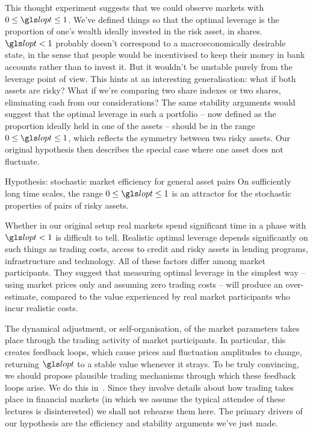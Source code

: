 This thought experiment suggests that we could observe markets with $0\leq\lopt\leq1$. We've defined things so that the optimal leverage is the proportion of one's wealth ideally invested in the risk asset, \ie in shares. $\lopt<1$ probably doesn't correspond to a macroeconomically desirable state, in the sense that people would be incentivised to keep their money in bank accounts rather than to invest it. But it wouldn't be unstable purely from the leverage point of view. This hints at an interesting generalisation: what if both assets are risky? What if we're comparing two share indexes or two shares, eliminating cash from our considerations? The same stability arguments would suggest that the optimal leverage in such a portfolio -- now defined as the proportion ideally held in one of the assets -- should be in the range $0\leq\lopt\leq1$, which reflects the symmetry between two risky assets. Our original hypothesis then describes the special case where one asset does not fluctuate.

\begin{keypts}{Hypothesis: stochastic market efficiency for general asset pairs}
On sufficiently long time scales, the range $0\leq\lopt\leq1$ is an attractor for the stochastic properties of pairs of risky assets. 
\end{keypts}

Whether in our original setup real markets spend significant time in a phase with $\lopt<1$ is difficult to tell. Realistic optimal leverage depends significantly on such things as trading costs, access to credit and risky assets in lending programs, infrastructure and technology. All of these factors differ among market participants. They suggest that measuring optimal leverage in the simplest way -- using market prices only and assuming zero trading costs -- will produce an over-estimate, compared to the value experienced by real market participants who incur realistic costs.

The dynamical adjustment, or self-organisation, of the market parameters takes place through the trading activity of market participants. In particular, this creates feedback loops, which cause prices and fluctuation amplitudes to change, returning $\lopt$ to a stable value whenever it strays. To be truly convincing, we should propose plausible trading mechanisms through which these feedback loops arise. We do this in~\cite{PetersAdamou2011}. Since they involve details about how trading takes place in financial markets (in which we assume the typical attendee of these lectures is disinterested) we shall not rehearse them here. The primary drivers of our hypothesis are the efficiency and stability arguments we've just made.

